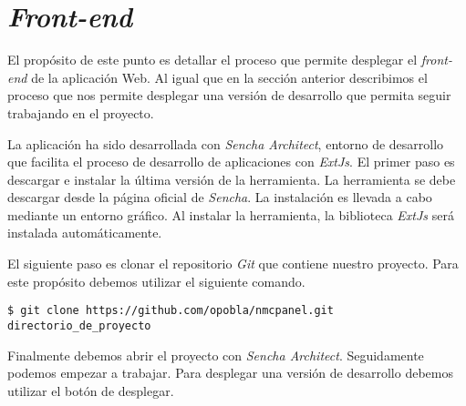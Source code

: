 \section{\emph{Front-end}}
	\label{app_front}
	El propósito de este punto es detallar el proceso que permite desplegar el \emph{front-end} de la aplicación Web. Al igual que en la sección
	anterior describimos el proceso que nos permite desplegar una versión de desarrollo que permita seguir trabajando en el proyecto.
	\par
	La aplicación ha sido desarrollada con \emph{Sencha Architect}, entorno de desarrollo que facilita el proceso de desarrollo de aplicaciones con
	\emph{ExtJs}. El primer paso es descargar e instalar la última versión de la herramienta. La herramienta se debe descargar desde la página oficial de
	\emph{Sencha}. La instalación es llevada a cabo mediante un entorno gráfico. Al instalar la herramienta, la biblioteca \emph{ExtJs} será instalada
	automáticamente.
	\par
	El siguiente paso es clonar el repositorio \emph{Git} que contiene nuestro proyecto. Para este propósito debemos utilizar el siguiente comando.
	\begin{lstlisting}[style=myBash]
$ git clone https://github.com/opobla/nmcpanel.git directorio_de_proyecto
	\end{lstlisting}
	Finalmente debemos abrir el proyecto con \emph{Sencha Architect}. Seguidamente podemos empezar a trabajar. Para desplegar una versión de desarrollo
	debemos utilizar el botón de desplegar.

